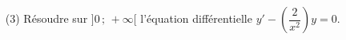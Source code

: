
\begin{exercice}\label{exoautoanalyseCTU-33devoir}

 
\begin{enumerate}
\item[(3)] Résoudre sur $]0\,;\,+\infty[$ l'équation différentielle $y'-\left(\dfrac{2}{x^2}\right)y=0$.
\end{enumerate}




\end{exercice}
